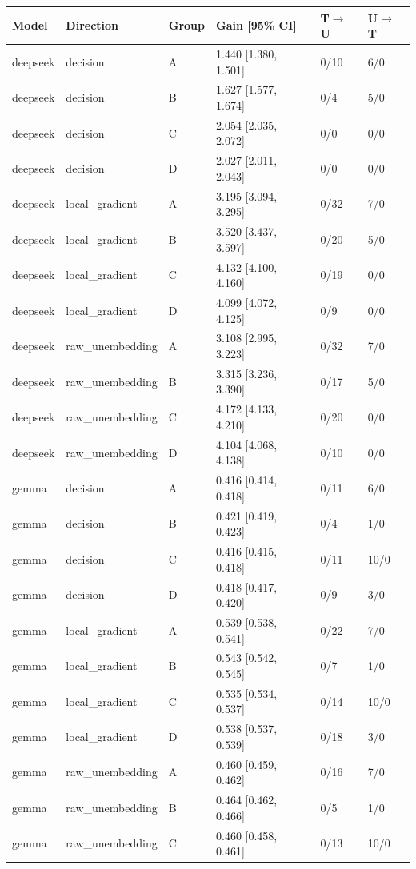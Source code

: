 \begin{tabular}{llllll}
\toprule
Model & Direction & Group & Gain [95\% CI] & T$\to$U & U$\to$T \\
\midrule
deepseek & decision & A & 1.440 [1.380, 1.501] & 0/10 & 6/0 \\
deepseek & decision & B & 1.627 [1.577, 1.674] & 0/4 & 5/0 \\
deepseek & decision & C & 2.054 [2.035, 2.072] & 0/0 & 0/0 \\
deepseek & decision & D & 2.027 [2.011, 2.043] & 0/0 & 0/0 \\
deepseek & local\_gradient & A & 3.195 [3.094, 3.295] & 0/32 & 7/0 \\
deepseek & local\_gradient & B & 3.520 [3.437, 3.597] & 0/20 & 5/0 \\
deepseek & local\_gradient & C & 4.132 [4.100, 4.160] & 0/19 & 0/0 \\
deepseek & local\_gradient & D & 4.099 [4.072, 4.125] & 0/9 & 0/0 \\
deepseek & raw\_unembedding & A & 3.108 [2.995, 3.223] & 0/32 & 7/0 \\
deepseek & raw\_unembedding & B & 3.315 [3.236, 3.390] & 0/17 & 5/0 \\
deepseek & raw\_unembedding & C & 4.172 [4.133, 4.210] & 0/20 & 0/0 \\
deepseek & raw\_unembedding & D & 4.104 [4.068, 4.138] & 0/10 & 0/0 \\
gemma & decision & A & 0.416 [0.414, 0.418] & 0/11 & 6/0 \\
gemma & decision & B & 0.421 [0.419, 0.423] & 0/4 & 1/0 \\
gemma & decision & C & 0.416 [0.415, 0.418] & 0/11 & 10/0 \\
gemma & decision & D & 0.418 [0.417, 0.420] & 0/9 & 3/0 \\
gemma & local\_gradient & A & 0.539 [0.538, 0.541] & 0/22 & 7/0 \\
gemma & local\_gradient & B & 0.543 [0.542, 0.545] & 0/7 & 1/0 \\
gemma & local\_gradient & C & 0.535 [0.534, 0.537] & 0/14 & 10/0 \\
gemma & local\_gradient & D & 0.538 [0.537, 0.539] & 0/18 & 3/0 \\
gemma & raw\_unembedding & A & 0.460 [0.459, 0.462] & 0/16 & 7/0 \\
gemma & raw\_unembedding & B & 0.464 [0.462, 0.466] & 0/5 & 1/0 \\
gemma & raw\_unembedding & C & 0.460 [0.458, 0.461] & 0/13 & 10/0 \\

\end{tabular}
